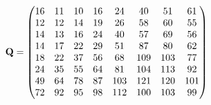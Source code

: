 \begin{equation}
	\mathbf{Q} = \begin{pmatrix}
	16 & 11 & 10 & 16 & 24 & 40 & 51 & 61\\
	12 & 12 & 14 & 19 & 26 & 58 & 60 & 55\\
	14 & 13 & 16 & 24 & 40 & 57 & 69 & 56\\
	14 & 17 & 22 & 29 & 51 & 87 & 80 & 62\\
	18 & 22 & 37 & 56 & 68 & 109 & 103 & 77\\
	24 & 35 & 55 & 64 & 81 & 104 & 113 & 92\\
	49 & 64 & 78 & 87 & 103 & 121 & 120 & 101\\
	72 & 92 & 95 & 98 & 112 & 100 & 103 & 99	
	\end{pmatrix}
\end{equation}











